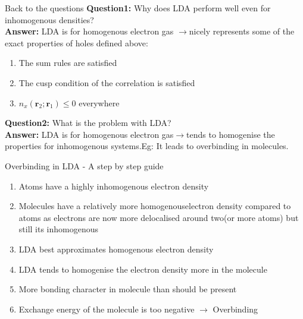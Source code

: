 \documentclass{beamer}
\begin{document}
	\begin{frame}[t]{Back to the questions}
	\textbf{Question1:} Why does LDA perform well even for inhomogenous densities?\pause \\
	\textbf{Answer: }LDA is for homogenous electron gas $\rightarrow$nicely represents some of the exact properties of holes defined above:
	\begin{enumerate}
	\item{The sum rules are satisfied}
	\item{The cusp condition of the correlation is satisfied}
	\item{$n_x(\textbf{r}_2;\textbf{r}_1)\leqslant 0 $ everywhere}
	\end{enumerate}\pause
	\vspace{0.5cm}
	\textbf{Question2:} What is the problem with LDA?\pause \\
	\textbf{Answer: } LDA is for homogenous electron gas$\rightarrow$tends to homogenise the properties for inhomogenous systems.Eg: It leads to overbinding in molecules.
	\end{frame}
	
	\begin{frame}[t]{Overbinding in LDA - A step by step guide}
	\begin{enumerate}
	\item{Atoms have a highly inhomogenous electron density}\pause
	\item{Molecules have a relatively more homogenous\pause electron density compared to atoms as electrons are now more delocalised around two(or more atoms) but still its inhomogenous}
	\item{LDA best approximates homogenous electron density}\pause
	\item{LDA tends to homogenise the electron density more in the molecule}\pause
	\item{More bonding character in molecule than should be present}\pause
	\item{Exchange energy of the molecule is too negative $\rightarrow$ Overbinding}
	\end{enumerate}
	\end{frame}
	
\end{document}
